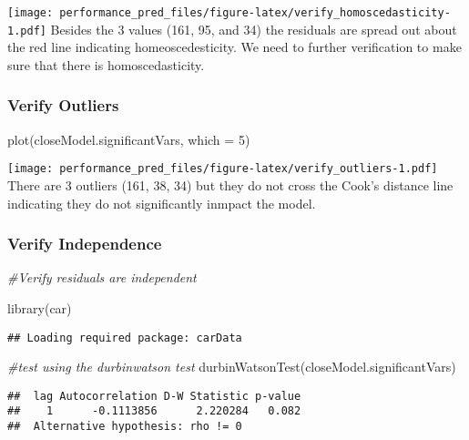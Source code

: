 \documentclass[
]{article}
\newenvironment{Shaded}{\begin{snugshade}}{\end{snugshade}}
\newcommand{\AttributeTok}[1]{\textcolor[rgb]{0.77,0.63,0.00}{#1}}
\newcommand{\CommentTok}[1]{\textcolor[rgb]{0.56,0.35,0.01}{\textit{#1}}}
\newcommand{\DecValTok}[1]{\textcolor[rgb]{0.00,0.00,0.81}{#1}}
\newcommand{\FunctionTok}[1]{\textcolor[rgb]{0.00,0.00,0.00}{#1}}
\newcommand{\NormalTok}[1]{#1}
\begin{document}
\texttt{[image: performance\_pred\_files/figure-latex/verify\_homoscedasticity-1.pdf]}
Besides the 3 values (161, 95, and 34) the residuals are spread out
about the red line indicating homeoscedesticity. We need to further
verification to make sure that there is homoscedasticity.

\hypertarget{verify-outliers}{%
\subsubsection{Verify Outliers}\label{verify-outliers}}

\begin{Shaded}
\begin{Highlighting}[]
\FunctionTok{plot}\NormalTok{(closeModel.significantVars, }\AttributeTok{which =} \DecValTok{5}\NormalTok{)}
\end{Highlighting}
\end{Shaded}

\texttt{[image: performance\_pred\_files/figure-latex/verify\_outliers-1.pdf]}
There are 3 outliers (161, 38, 34) but they do not cross the Cook's
distance line indicating they do not significantly inmpact the model.

\hypertarget{verify-independence}{%
\subsubsection{Verify Independence}\label{verify-independence}}

\begin{Shaded}
\begin{Highlighting}[]
\CommentTok{\#Verify residuals are independent}

\FunctionTok{library}\NormalTok{(car)}
\end{Highlighting}
\end{Shaded}

\begin{verbatim}
## Loading required package: carData
\end{verbatim}

\begin{Shaded}
\begin{Highlighting}[]
\CommentTok{\#test using the durbinwatson test}
\FunctionTok{durbinWatsonTest}\NormalTok{(closeModel.significantVars)}
\end{Highlighting}
\end{Shaded}

\begin{verbatim}
##  lag Autocorrelation D-W Statistic p-value
##    1      -0.1113856      2.220284   0.082
##  Alternative hypothesis: rho != 0
\end{verbatim}
\end{document}
